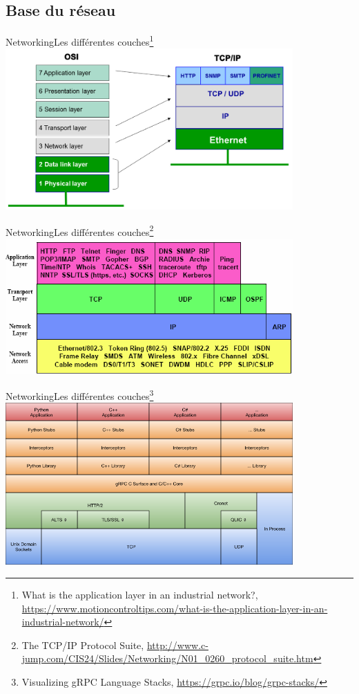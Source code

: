 \documentclass{beamer}
\begin{document}
    \subsection{Base du réseau}\label{subsec:basic-network}

    \begin{frame}{Networking}{Les différentes couches\footnote{What is the application layer in an industrial network?, \url{https://www.motioncontroltips.com/what-is-the-application-layer-in-an-industrial-network/}}}
        \centering
        \includegraphics[width=11cm]{image/OSI-vs-TCPIP-Layers}
    \end{frame}

    \begin{frame}{Networking}{Les différentes couches\footnote{The TCP/IP Protocol Suite, \url{http://www.c-jump.com/CIS24/Slides/Networking/N01_0260_protocol_suite.htm}}}
        \centering
        \includegraphics[width=11cm]{image/tcp_ip_suite}
    \end{frame}

    \begin{frame}{Networking}{Les différentes couches\footnote{Visualizing gRPC Language Stacks, \url{https://grpc.io/blog/grpc-stacks/}}}
        \centering
        \includegraphics[width=11cm]{image/grpc-core-stack}
    \end{frame}
\end{document}
